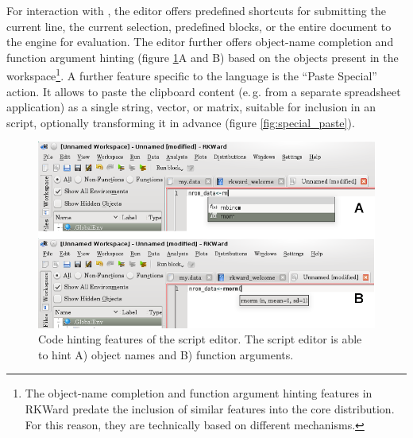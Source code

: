 For interaction with , the editor offers
predefined shortcuts for submitting the current line, the current
selection, predefined blocks, or the entire document to the
 engine for evaluation. The editor further
offers object-name completion and function argument hinting (figure
\ref{fig:code_hinting}A and B) based on the objects present in
the  workspace\footnote{The object-name
completion and function argument hinting features in RKWard predate the
inclusion of similar features into the core
 distribution. For this reason, they are
technically based on different mechanisms.}. A further feature specific
to the  language is the
``Paste Special'' action. It allows to
paste the clipboard content (e.\,g. from a separate spreadsheet
application) as a single string, vector, or matrix, suitable
for inclusion in an  script, optionally
transforming it in advance (figure \ref{fig:special_paste}).

\begin{figure}[htp]
 \centering
 \includegraphics{../figures/code_hinting.png}
 \caption{Code hinting features of the script editor. The script editor is able to hint A)  object names
and B) function arguments.}
 \label{fig:code_hinting}
\end{figure}

